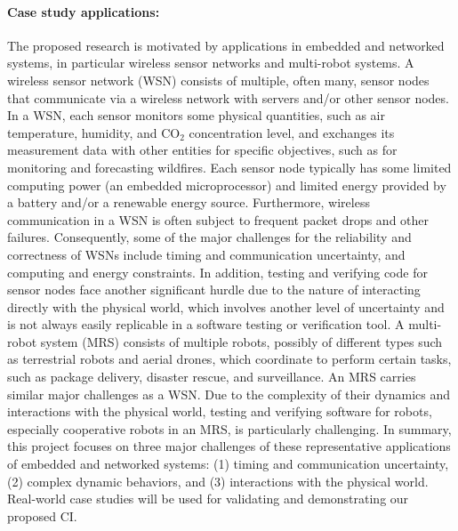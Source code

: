 \paragraph{Case study applications:}
\label{sec:field-applications}
The proposed research is motivated by applications in embedded and networked systems, in particular wireless sensor networks and multi-robot systems.
A wireless sensor network (WSN) consists of multiple, often many, sensor nodes that communicate via a wireless network with servers and/or other sensor nodes.
In a WSN, each sensor monitors some physical quantities, such as air temperature, humidity, and CO$_{2}$ concentration level, and exchanges its measurement data with other entities %
for specific objectives, such as for monitoring and forecasting wildfires.
Each sensor node typically has some limited computing power (an embedded microprocessor) and limited energy provided by a battery and/or a renewable energy source.
Furthermore, wireless communication in a WSN is often subject to frequent %
packet drops and other failures.
Consequently, some of the major challenges for the reliability and correctness of WSNs include timing and communication uncertainty, and computing and energy constraints.
In addition, testing and verifying  code for sensor nodes face another significant hurdle due to the nature of interacting directly with the physical world, which involves another level of uncertainty and is not always easily replicable in a software testing or verification tool.
%
A multi-robot system (MRS) consists of multiple robots, possibly of different types such as terrestrial robots and aerial drones, which coordinate to perform certain tasks, such as package delivery, disaster rescue, and surveillance.
An MRS carries similar major challenges as a WSN.
Due to the complexity of their dynamics and interactions with the physical world, testing and verifying software for robots, especially cooperative robots in an MRS, is particularly challenging.
%
In summary, this project focuses on three %
major challenges of these representative applications %
of embedded and networked systems:
(1) timing and communication uncertainty,
(2) complex dynamic behaviors, and
(3) interactions with the physical world.
Real-world case studies will be used for validating and demonstrating our proposed CI.


